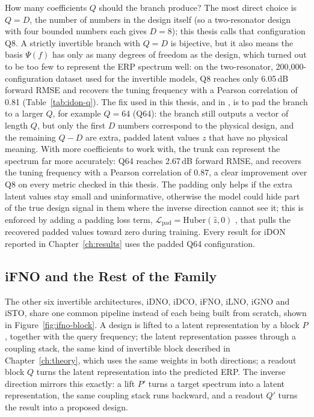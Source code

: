 How many coefficients $Q$ should the branch produce? The most direct choice is $Q = D$, the number of numbers in the design itself (so a two-resonator design with four bounded numbers each gives $D=8$); this thesis calls that configuration Q8. A strictly invertible branch with $Q=D$ is bijective, but it also means the basis $\Psi(f)$ has only as many degrees of freedom as the design, which turned out to be too few to represent the ERP spectrum well: on the two-resonator, 200{,}000-configuration dataset used for the invertible models, Q8 reaches only 6.05\,dB forward RMSE and recovers the tuning frequency with a Pearson correlation of 0.81 (Table~\ref{tab:idon-q}). The fix used in this thesis, and in \textcite{kaltenbach2023invertible}, is to pad the branch to a larger $Q$, for example $Q=64$ (Q64): the branch still outputs a vector of length $Q$, but only the first $D$ numbers correspond to the physical design, and the remaining $Q-D$ are extra, padded latent values $z$ that have no physical meaning. With more coefficients to work with, the trunk can represent the spectrum far more accurately: Q64 reaches 2.67\,dB forward RMSE, and recovers the tuning frequency with a Pearson correlation of 0.87, a clear improvement over Q8 on every metric checked in this thesis. The padding only helps if the extra latent values stay small and uninformative, otherwise the model could hide part of the true design signal in them where the inverse direction cannot see it; this is enforced by adding a padding loss term, $\mathcal L_\text{pad} = \mathrm{Huber}(\hat z, 0)$ \parencite{huber1964robust}, that pulls the recovered padded values toward zero during training. Every result for iDON reported in Chapter~\ref{ch:results} uses the padded Q64 configuration.

\subsection{iFNO and the Rest of the Family}
\label{sec:ifno}

The other six invertible architectures, iDNO, iDCO, iFNO, iLNO, iGNO and iSTO, share one common pipeline instead of each being built from scratch, shown in Figure~\ref{fig:ifno-block}. A design is lifted to a latent representation by a block $P$, together with the query frequency; the latent representation passes through a coupling stack, the same kind of invertible block described in Chapter~\ref{ch:theory}, which uses the same weights in both directions; a readout block $Q$ turns the latent representation into the predicted ERP. The inverse direction mirrors this exactly: a lift $P'$ turns a target spectrum into a latent representation, the same coupling stack runs backward, and a readout $Q'$ turns the result into a proposed design.

